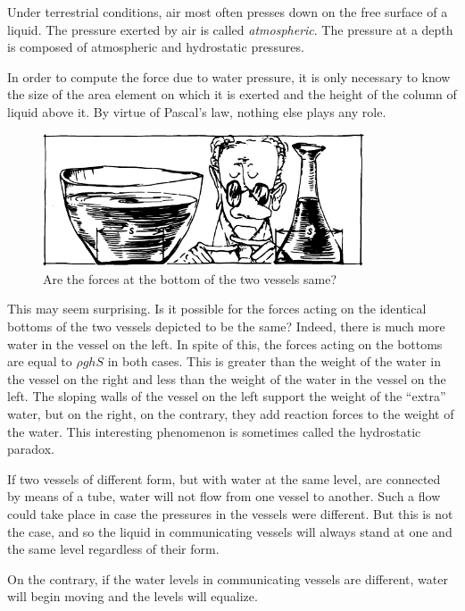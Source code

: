 Under terrestrial conditions, air most often presses down on the free surface of a liquid. The pressure exerted by air is called \emph{atmospheric}. The pressure at a depth is composed of atmospheric and hydrostatic pressures.

In order to compute the force due to water pressure, it is only necessary to know the size of the area element on which it is exerted and the height of the column of liquid above it. By virtue of Pascal's law, nothing else plays any role.

\begin{figure}[!ht]
\centering
\includegraphics[width=0.85\textwidth]{figures/fig-7-3.pdf}
\caption{Are the forces at the bottom of the two vessels same?}
\label{fig-7-3}
\end{figure}


This may seem surprising. Is it possible for the forces acting on the identical bottoms of the two vessels depicted  to be the same? Indeed, there is much more water in the vessel on the left. In spite of this, the forces acting on the bottoms are equal to $\rho g h S$ in both cases. This is greater than the weight of the water in the vessel on the right and less than the weight of the water in the vessel on the left. The sloping walls of the vessel on the left support the weight of the ``extra'' water, but on the right, on the contrary, they add reaction forces to the weight of the water. This interesting phenomenon is sometimes called the hydrostatic paradox.

If two vessels of different form, but with water at the same level, are connected by means of a tube, water will not flow from one vessel to another. Such a flow could take place in case the pressures in the vessels were different. But this is not the case, and so the liquid in communicating vessels will always stand at one and the same level regardless of their form.

On the contrary, if the water levels in communicating vessels are different, water will begin moving and the levels will equalize.

